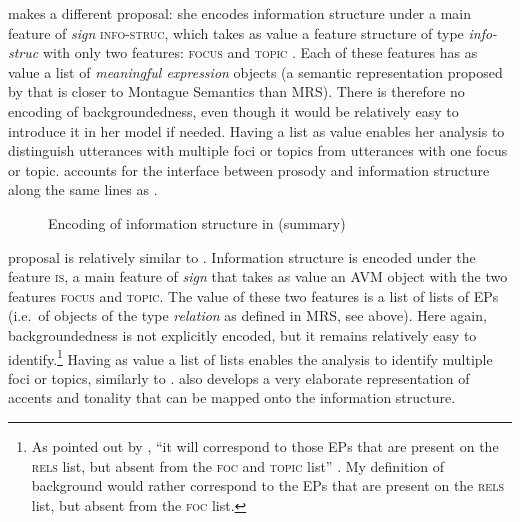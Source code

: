 \citet{DeKuthy.2002} makes a different proposal: she encodes information structure under a main feature of \emph{sign} \textsc{info-struc}, which takes as value a feature structure of type \emph{info-struc} with only two features: \textsc{focus} and \textsc{topic} \citep[161--165]{DeKuthy.2002}.
Each of these features has as value a list of \emph{meaningful expression} objects (a semantic representation proposed by \citet{Richter.2000} that is closer to Montague Semantics \citep{Dowty.1981} than MRS). There is therefore no encoding of backgroundedness, even though it would be relatively easy to introduce it in her model if needed. Having a list as value enables her analysis to distinguish utterances with multiple foci or topics from utterances with one focus or topic.
\citeauthor{DeKuthy.2002} accounts for the interface between prosody and information structure along the same lines as \citet{Engdahl.1996}. 

\begin{figure}[h]
\caption{Encoding of information structure in \citet[161--165]{DeKuthy.2002} (summary)}
\end{figure}


 proposal is relatively similar to \citet{DeKuthy.2002}. Information structure is encoded under the feature \textsc{is}, a main feature of \emph{sign} that takes as value an AVM object with  the two features \textsc{focus} and \textsc{topic}. The value of these two features is a list of lists of EPs (i.e.\ of objects of the type \emph{relation} as defined in MRS, see above). Here again, backgroundedness is not explicitly encoded, but it remains relatively easy to identify.\footnote{As pointed out by \citeauthor{Bildhauer.2008}, ``it will correspond to those EPs that are present on the \textsc{rels} list, but absent from the \textsc{foc} and \textsc{topic} list'' \citep[147]{Bildhauer.2008}. My definition of background would rather correspond to the EPs that are present on the \textsc{rels} list, but absent from the \textsc{foc} list.} Having as value a list of lists enables the analysis to identify multiple foci or topics, similarly to \citeauthor{DeKuthy.2002}.  \citeauthor{Bildhauer.2008} also develops a very elaborate representation of accents and tonality that can be mapped onto the information structure. 

